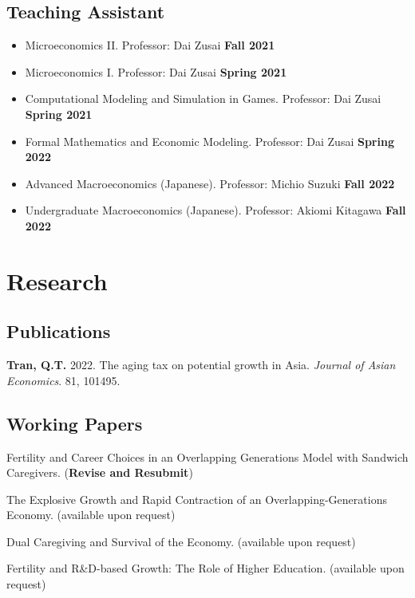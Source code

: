 \documentclass[12pt]{article}
\begin{document}
\subsection{Teaching Assistant}
\begin{itemize}
	\item[ ] Microeconomics II. Professor: Dai Zusai \hfill {\bf Fall 2021}
	\item[ ] Microeconomics I. Professor: Dai Zusai \hfill {\bf Spring 2021}
	\item[ ] Computational Modeling and Simulation in Games. Professor: Dai Zusai \hfill {\bf Spring 2021}
	\item[ ] Formal Mathematics and Economic Modeling. Professor: Dai Zusai \hfill {\bf Spring 2022}
	\item[ ] Advanced Macroeconomics (Japanese). Professor: Michio Suzuki \hfill {\bf Fall 2022}
	\item[ ] Undergraduate Macroeconomics (Japanese). Professor: Akiomi Kitagawa \hfill {\bf Fall 2022}
\end{itemize}


\section{Research}

\subsection{Publications}

\begin{enumerate}[label={[\arabic*]}]

\item \textbf{Tran, Q.T.} 2022. The aging tax on potential growth in Asia. \textit{Journal of Asian Economics}. 81, 101495. 
\end{enumerate}

\subsection{Working Papers}

\begin{enumerate}[label={[\arabic*]}]

\item Fertility and Career Choices in an Overlapping Generations Model with Sandwich Caregivers. (\textbf{Revise and Resubmit})

\item The Explosive Growth and Rapid Contraction of an Overlapping-Generations Economy. (available upon request)

\item Dual Caregiving and Survival of the Economy. (available upon request)

\item Fertility and R\&D-based Growth: The Role of Higher Education. (available upon request)

\end{enumerate}
\end{document}
